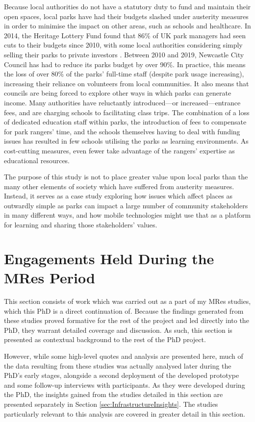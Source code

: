 Because local authorities do not have a statutory duty to fund and maintain their open spaces, local parks have had their budgets slashed under austerity measures in order to minimise the impact on other areas, such as schools and healthcare. In 2014, the Heritage Lottery Fund found that 86\% of UK park managers had seen cuts to their budgets since 2010, with some local authorities considering simply selling their parks to private investors \citep{HeritageLotteryFund2014}. Between 2010 and 2019, Newcastle City Council has had to reduce its parks budget by over 90\%. In practice, this means the loss of over 80\% of the parks' full-time staff (despite park usage increasing), increasing their reliance on volunteers from local communities.  It also means that councils are being forced to explore other ways in which parks can generate income. Many authorities have reluctantly introduced---or increased---entrance fees, and are charging schools to facilitating class trips. The combination of a loss of dedicated education staff within parks, the introduction of fees to compensate for park rangers’ time, and the schools themselves having to deal with funding issues has resulted in few schools utilising the parks as learning environments. As cost-cutting measures, even fewer take advantage of the rangers’ expertise as educational resources.

The purpose of this study is not to place greater value upon local parks than the many other elements of society which have suffered from austerity measures. Instead, it serves as a case study exploring how issues which affect places as outwardly simple as parks can impact a large number of community stakeholders in many different ways, and how mobile technologies might use that as a platform for learning and sharing those stakeholders' values.

\section{Engagements Held During the MRes Period}

This section consists of work which was carried out as a part of my MRes studies, which this PhD is a direct continuation of. Because the findings generated from these studies proved formative for the rest of the project and led directly into the PhD, they warrant detailed coverage and discussion. As such, this section is presented as contextual background to the rest of the PhD project.

However, while some high-level quotes and analysis are presented here, much of the data resulting from these studies was actually analysed later during the PhD's early stages, alongside a second deployment of the developed prototype and some follow-up interviews with participants. As they were developed during the PhD, the insights gained from the studies detailed in this section are presented separately in Section \ref{sec:InfrastructureInsights}. The studies particularly relevant to this analysis are covered in greater detail in this section.

